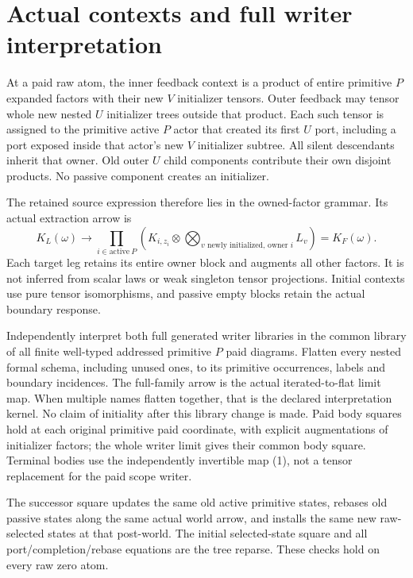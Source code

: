 \documentclass[11pt]{article}\usepackage{amsmath,amssymb,amsthm,geometry}\geometry{margin=1in}\newtheorem{lemma}{Lemma}\newtheorem{theorem}[lemma]{Theorem}
\begin{document}
\section{Actual contexts and full writer interpretation}
At a paid raw atom, the inner feedback context is a product of entire primitive $P$ expanded factors with their new $V$ initializer tensors. Outer feedback may tensor whole new nested $U$ initializer trees outside that product. Each such tensor is assigned to the primitive active $P$ actor that created its first $U$ port, including a port exposed inside that actor's new $V$ initializer subtree. All silent descendants inherit that owner. Old outer $U$ child components contribute their own disjoint products. No passive component creates an initializer.

The retained source expression therefore lies in the owned-factor grammar. Its actual extraction arrow is
\[
 K_L(\omega)\longrightarrow
 \prod_{i\in\mathrm{active}\ P}
       \left(K_{i,z_i}\otimes\bigotimes_{v\text{ newly initialized, owner }i}L_v\right)
                 =K_F(\omega).                       \tag{2}
\]
Each target leg retains its entire owner block and augments all other factors. It is not inferred from scalar laws or weak singleton tensor projections. Initial contexts use pure tensor isomorphisms, and passive empty blocks retain the actual boundary response.

Independently interpret both full generated writer libraries in the common library of all finite well-typed addressed primitive $P$ paid diagrams. Flatten every nested formal schema, including unused ones, to its primitive occurrences, labels and boundary incidences. The full-family arrow is the actual iterated-to-flat limit map. When multiple names flatten together, that is the declared interpretation kernel. No claim of initiality after this library change is made. Paid body squares hold at each original primitive paid coordinate, with explicit augmentations of initializer factors; the whole writer limit gives their common body square. Terminal bodies use the independently invertible map (1), not a tensor replacement for the paid scope writer.

The successor square updates the same old active primitive states, rebases old passive states along the same actual world arrow, and installs the same new raw-selected states at that post-world. The initial selected-state square and all port/completion/rebase equations are the tree reparse. These checks hold on every raw zero atom.
\end{document}
